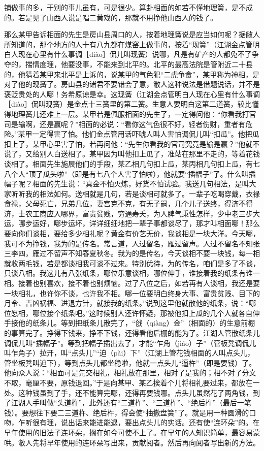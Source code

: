 \documentclass[12pt,UTF8]{ctexbook}
\begin{document}
铺做事的多，干别的事儿虽有，可是很少。算卦相面的如若不懂地理簧，是不成的。若是见了山西人说是唱二黄戏的，那就不用挣他山西人的钱了。

那么某甲告诉相面的先生是房山县周口的人，按着地理簧说是应当如何呢？据敝人所知道的，那个地方的人十有八九都在煤窑上做事的，按着“现簧”（江湖金点管明白人现在心里有什么事调［diào］侃儿叫现簧）说哪，凡是有矿产的人都免不了争夺的，揣情度理，他要没事，不能来到北平的。北平的最高法院是管附近二十县的，他猜着某甲来北平是上诉的，说某甲的气色犯“二虎争食”，某甲称为神相，是对了他的现簧了。房山县的诸君不要错会了意，敝人这种说法是借题说话，并不是褒贬贵处的人哪！务希原谅是幸。这现簧（江湖金点管明白人现在心里有什么事调［diào］侃叫现簧）是金点十三簧里的第二簧。生意人要明白这第二道簧，较比懂得地理簧儿还难上一层。某甲若是佩服相面的先生了，一定得问他：“你看我打官司是输啊，还是赢呢？”相面的必说：“看你这气色很不好，轻者伤财，重者有危险。”某甲一定得害了怕。他们金点管用话吓唬人叫人害怕调侃儿叫“扣瓜”。他把瓜扣上了，某甲心里害了怕，若再问他：“先生你看我的官司究竟是输是赢？”他就不说了，又给别人白送相了。某甲因为叫他扣上瓜了，准站在那里不走的，等着花钱谈相了。相面先生施展他们的手段，某乙相几句扣上瓜，某丙相几句扣上瓜，有七八个人“顶了瓜头啦”（即是有七八个人害了怕啦），他就要“插幅子”了。什么叫插幅子呢？相面的先生说：“真金不怕火炼，好货不怕试验。我送几句相法，是叫大家听听我的相法如何。送相就是几句，若是谈相可就多了。一辈子吃喝穿戴，衣禄食禄，父母死亡，兄弟几位，妻宫克不克，有无子嗣，几个儿子送终，得济不得济，士农工商应入哪界，富贵贫贱，穷通寿夭，为人脾气秉性怎样，少中老三步大运，哪步运好，哪步运坏，详详细细地把一辈子事都谈尽了，那才叫相面哪！那么要向你们谈相，要给多少相礼呢？黄金有价艺无价，我谈相是一块大洋。今天哪，我可不为挣钱，我为的是传名。常言道，人过留名，雁过留声。人过不留名不知张三李四，雁过不留声不知春夏秋冬。我为的是传名，今天谈相不要一块钱，每一相就收两毛钱，若是都谈相我可谈不过来。特别优待，为的传名，咱们是多了不谈，只谈八相。我这儿有八张纸条，哪位乐意谈相，哪位伸手，谁接着我的纸条有谁一相。接着也别喜欢，接不着也别烦恼。过了八位之后，如若再有人谈相，我还是要一块相礼，也许你不谈，也许我不相。哪一位要明白终身大事、富贵贫贱、目下的月令、吉凶祸福、进退方针，就接我的纸条。”说到这里他就散他的纸条，说：“哪位愿相，哪位接个纸条吧。”这时候别人还许怀疑，那被他扣上瓜的几个人就各自伸手接他的纸条儿。等到把纸条儿散完了，“戗（qiàng）金”（相面的）的生意前棚的事算完了。挣得下钱来，挣不下钱，还得看他后棚的能为了。江湖人管散纸条儿调侃儿叫“插幅子”。等到把幅子插出去了，才能“乍角（jiǎo）子”（管板凳调侃儿叫乍角子）拉开，叫“点头儿”“迫（pǎi）下”（江湖上管花钱相面的人叫点头儿，管坐板凳叫迫下），等到点头儿都坐稳啦，他就一点头儿“逼杵”（即是要钱）了。他向众人说：“相面可是先交相礼，相礼放在那里，相对了是我的；相不对了分文不取，毫厘不要，原钱退回。”于是向某甲、某乙挨着个儿将相礼要过来，都放在一处。这种钱虽到了手，还不能算完哪，还得再要钱哪。点头儿虽然花了两角钱，到了江湖人手叫做“头道杵”，此外还有“二道杵”、“三道杵”、“绝后杵”（最后一笔钱）。要想往下要二三道杵、绝后杵，得会使“抽撤盘簧”了。就是用一种圆滑的口吻，乍听很有理，说出话来能进能退，要出点头儿的实话。还有使“连环朵”的。在早年使用的旧法子连环朵，搁在如今可使不上了。在早年的人知识简单，最容易蒙哄。敝人先将早年使用的连环朵写出来，贡献阅者。然后再向阅者写出新的方法。
\end{document}
